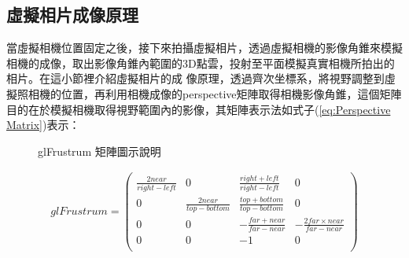\subsection{虛擬相片成像原理}
%
	當虛擬相機位置固定之後，接下來拍攝虛擬相片，透過虛擬相機的影像角錐來模擬相機的成像，取出影像角錐內範圍的3D點雲，投射至平面模擬真實相機所拍出的相片。在這小節裡介紹虛擬相片的成
	像原理，透過齊次坐標系，將視野調整到虛擬照相機的位置，再利用相機成像的perspective矩陣取得相機影像角錐，這個矩陣目的在於模擬相機取得視野範圍內的影像，其矩陣表示法如式子(\ref{eq:Perspective Matrix})表示：	

\begin{figure}
  \begin{center}
  \end{center}
  \caption{glFrustrum 矩陣圖示說明}
  \label{fig:camera reference}
\end{figure}
    
	\begin{align}
	glFrustrum = \left( \label{eq:Perspective Matrix}
		 			\begin{array}{cccc}
		 			\frac{2near}{right - left} & 0 & \frac{right + left}{right - left} & 0 \\
		 			0 & \frac{2near}{top - bottom} & \frac{top + bottom}{top - bottom} & 0 \\
		 			0 & 0 & -\frac{far + near}{far - near}  & -\frac{2far \times near}{far - near} \\
		 			0 & 0 & -1 & 0 \\
		 			\end{array}
		 		\right)
	\end{align}
	
